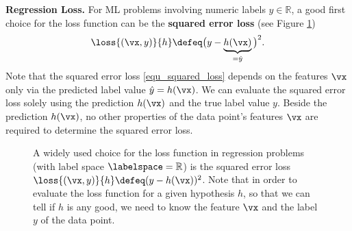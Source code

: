 \documentclass[12pt]{report}
\begin{document}
{\bf Regression Loss.} For ML problems involving numeric labels $y \in \mathbb{R}$, 
a good first choice for the loss function can be the {\bf squared error loss} (see Figure \ref{fig_squarederror_loss}) 
\begin{equation} 
\label{equ_squared_loss}
\loss{(\vx,y)}{h} \defeq \big(y - \underbrace{h(\vx)}_{=\hat{y}} \big)^{2}. 
\end{equation} 
Note that the squared error loss \eqref{equ_squared_loss} depends on the features 
$\vx$ only via the predicted label value $\hat{y}= h(\vx)$. We can evaluate the squared 
error loss solely using the prediction $h(\vx)$ and the true label value $y$. Beside the prediction $h(\vx)$, 
no other properties of the data point's features $\vx$ are required to determine the squared error loss.  

\begin{figure}[htbp]
\begin{center}
     \vspace*{-4mm}
\end{center}
\caption{A widely used choice for the loss function in regression problems 
	(with label space $\labelspace=\mathbb{R}$) is the squared error loss $\loss{(\vx,y)}{h} \defeq (y - h(\vx))^{2}$. 
Note that in order to evaluate the loss function for a given hypothesis $h$, so that 
we can tell if $h$ is any good, we need to know the feature $\vx$ and the label $y$ of the data point.}
\label{fig_squarederror_loss}
\end{figure}
\end{document}
